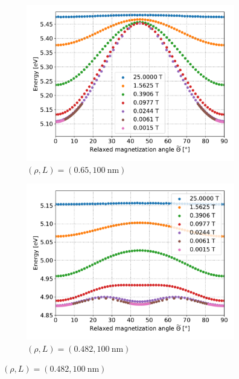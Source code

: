 \documentclass[11pt,a4paper,english,twoside]{article}
\begin{document}
\begin{figure}
     \centering
     \begin{subfigure}[b]{0.8\textwidth}
         \centering
         \includegraphics[width=\textwidth]{Figures/biaxial_island/BarrierLandscape/Plus_65_B25-0.001-div4_a128Pi_plotOptimized.pdf}
         \caption{$(\rho, L)=(0.65, \SI{100}{\nano\metre})$}
         \label{fig:barrierLandscape-sweepBext_r0.65}
     \end{subfigure}
     \begin{subfigure}[b]{0.8\textwidth}
         \centering
         \includegraphics[width=\textwidth]{Figures/biaxial_island/BarrierLandscape/Plus_48.2_B25-0.001-div4_a128Pi_plotOptimized.pdf}
         \caption{$(\rho, L)=(0.482, \SI{100}{\nano\metre})$}

\end{subfigure}
\end{figure}
\end{document}
